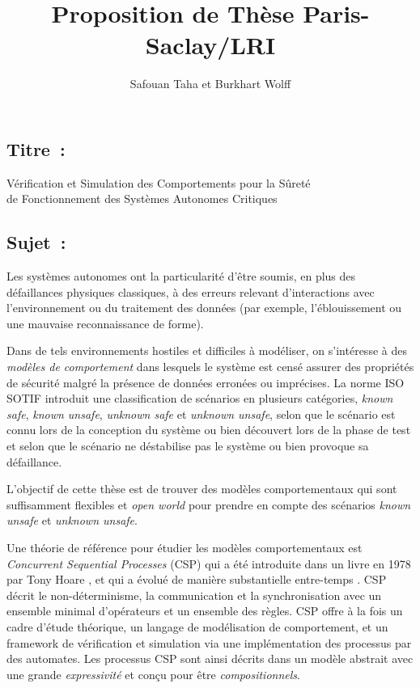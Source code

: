 \documentclass[a4paper,10pt]{article}
\begin{document}
\title{\textbf{Proposition de Thèse Paris-Saclay/LRI}}
\author{Safouan Taha et Burkhart Wolff}
\date{}

\maketitle

\subsection*{Titre~:}
\begin{center}
\large Vérification et Simulation des Comportements pour la Sûreté \\
  de Fonctionnement des Systèmes Autonomes Critiques
\end{center}

\subsection*{Sujet~:}
Les systèmes autonomes ont la particularité d'être soumis,
en plus des défaillances physiques classiques,
à des erreurs relevant d'interactions avec l'environnement
ou du traitement des données
(par exemple, l'éblouissement ou une mauvaise reconnaissance de forme).

Dans de tels environnements hostiles et difficiles à modéliser,
on s'intéresse à des \emph{modèles de comportement}
dans lesquels le système est censé assurer des propriétés de sécurité
malgré la présence de données erronées ou imprécises.
La norme ISO SOTIF \cite{iso-2019-sotif} introduit
une classification de scénarios en plusieurs catégories,
\emph{known safe}, \emph{known unsafe}, \emph{unknown safe}
et \emph{unknown unsafe}, selon que le scénario est connu
lors de la conception du système ou bien découvert lors de la phase de test
et selon que le scénario ne déstabilise pas le système
ou bien provoque sa défaillance.

L'objectif de cette thèse est de trouver des modèles comportementaux
qui sont suffisamment flexibles et \emph{open world} pour prendre en compte
des scénarios \emph{known unsafe} et \emph{unknown unsafe}.

Une théorie de référence pour étudier les modèles comportementaux est
\emph{Concurrent Sequential Processes} (CSP)
qui a été introduite dans un livre en 1978
par Tony Hoare \cite{Hoare:1985:CSP:3921},
et qui a évolué de manière substantielle
entre-temps \cite{BrookesHR84,brookes-roscoe85,roscoe:csp:1998}.
CSP décrit le non-déterminisme, la communication
et la synchronisation avec un ensemble minimal d'opérateurs
et un ensemble des règles.
CSP offre à la fois un cadre d'étude théorique,
un langage de modélisation de comportement,
et un framework de vérification et simulation
via une implémentation des processus par des automates.
Les processus CSP sont ainsi décrits dans un modèle abstrait
avec une grande \emph{expressivité} et conçu pour être \emph{compositionnels}.
\end{document}

